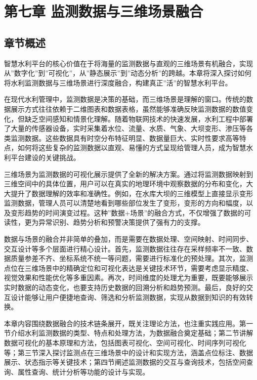 \section{第七章
监测数据与三维场景融合}\label{ux7b2cux4e03ux7ae0-ux76d1ux6d4bux6570ux636eux4e0eux4e09ux7ef4ux573aux666fux878dux5408}

\subsection{章节概述}\label{ux7ae0ux8282ux6982ux8ff0}

智慧水利平台的核心价值在于将海量的监测数据与直观的三维场景有机融合，实现从''数字化''到''可视化''，从''静态展示''到''动态分析''的跨越。本章将深入探讨如何将水利监测数据与三维场景进行深度融合，构建真正''活''的智慧水利平台。

在现代水利管理中，监测数据是决策的基础，而三维场景是理解的窗口。传统的数据展示方式往往依赖于二维图表和数据表格，虽然能够准确反映监测数据的数值变化，但缺乏空间感知和情景化理解。随着物联网技术的快速发展，水利工程中部署了大量的传感器设备，实时采集着水位、流量、水质、气象、大坝变形、渗压等各类监测数据。这些数据具有时空分布特征明显、数据量巨大、实时性要求高等特点，如何将这些复杂的监测数据以直观、易懂的方式呈现给管理人员，成为智慧水利平台建设的关键挑战。

三维场景为监测数据的可视化展示提供了全新的解决方案。通过将监测数据映射到三维空间中的具体位置，用户可以在真实的地理环境中观察数据的分布和变化，大大提升了数据理解的效率和准确性。例如，在水库大坝的三维模型上直接显示变形监测数据，管理人员可以清楚地看到哪些部位发生了变形，变形的方向和幅度，以及变形趋势的时间演变过程。这种''数据+场景''的融合方式，不仅增强了数据的可读性，更为异常识别、趋势分析和预警决策提供了强有力的支撑。

数据与场景的融合并非简单的叠加，而是需要在数据处理、空间映射、时间同步、交互设计等多个层面进行精心设计。首先，监测数据往往存在采样频率不一致、数据质量参差不齐、坐标系统不统一等问题，需要进行标准化的预处理。其次，监测点位在三维场景中的精确定位和可视化表达是关键技术环节，需要考虑显示精度、视觉效果和性能优化等多重因素。再次，时间维度的处理尤为重要，既要能够展示实时数据的动态变化，也要支持历史数据的回溯分析和趋势预测。最后，良好的交互设计能够让用户便捷地查询、筛选和分析监测数据，实现从数据到知识的有效转换。

本章内容围绕数据融合的技术链条展开，既关注理论方法，也注重实践应用。第一节介绍水利监测数据的类型、特点和处理方法，为数据融合奠定基础；第二节讲解数据可视化的基本原理和方法，包括图表可视化、空间可视化、时间序列可视化等；第三节深入探讨监测点在三维场景中的设计和实现方法，涵盖点位标注、数据展示、状态指示等关键技术；第四节阐述监测数据的交互与查询技术，包括空间查询、属性查询、统计分析等功能的设计与实现。

